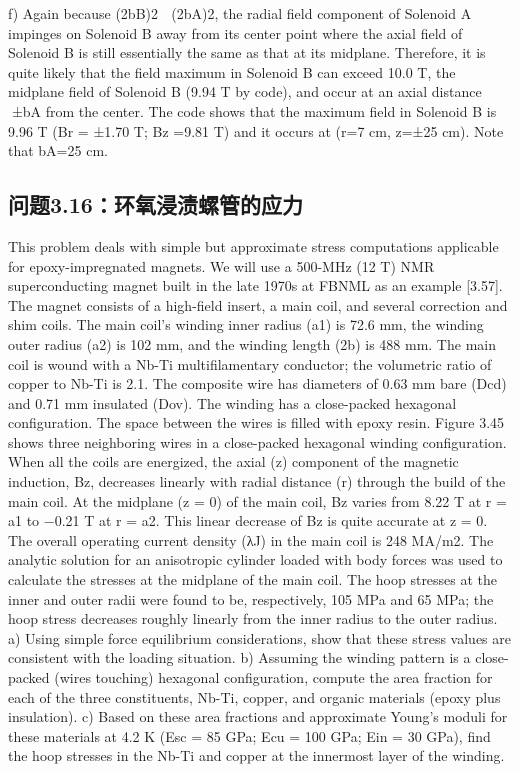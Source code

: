 f) Again because (2bB)2  (2bA)2, the radial field component of Solenoid A impinges on Solenoid B away from its center point where the axial field of Solenoid
B is still essentially the same as that at its midplane. Therefore, it is quite likely
that the field maximum in Solenoid B can exceed 10.0 T, the midplane field of
Solenoid B (9.94 T by code), and occur at an axial distance ∼±bA from the center.
The code shows that the maximum field in Solenoid B is 9.96 T (Br = ±1.70 T;
Bz =9.81 T) and it occurs at (r=7 cm, z=±25 cm). Note that bA=25 cm.
\newpage
\subsection{问题3.16：环氧浸渍螺管的应力}
This problem deals with simple but approximate stress computations applicable for
epoxy-impregnated magnets. We will use a 500-MHz (12 T) NMR superconducting magnet built in the late 1970s at FBNML as an example [3.57]. The magnet
consists of a high-field insert, a main coil, and several correction and shim coils.
The main coil’s winding inner radius (a1) is 72.6 mm, the winding outer radius
(a2) is 102 mm, and the winding length (2b) is 488 mm. The main coil is wound
with a Nb-Ti multifilamentary conductor; the volumetric ratio of copper to Nb-Ti
is 2.1. The composite wire has diameters of 0.63 mm bare (Dcd) and 0.71 mm insulated (Dov). The winding has a close-packed hexagonal configuration. The space
between the wires is filled with epoxy resin. Figure 3.45 shows three neighboring
wires in a close-packed hexagonal winding configuration.
When all the coils are energized, the axial (z) component of the magnetic induction, Bz, decreases linearly with radial distance (r) through the build of the main
coil. At the midplane (z = 0) of the main coil, Bz varies from 8.22 T at r = a1
to −0.21 T at r = a2. This linear decrease of Bz is quite accurate at z = 0. The
overall operating current density (λJ) in the main coil is 248 MA/m2.
The analytic solution for an anisotropic cylinder loaded with body forces was used
to calculate the stresses at the midplane of the main coil. The hoop stresses at
the inner and outer radii were found to be, respectively, 105 MPa and 65 MPa; the
hoop stress decreases roughly linearly from the inner radius to the outer radius.
a) Using simple force equilibrium considerations, show that these stress values
are consistent with the loading situation.
b) Assuming the winding pattern is a close-packed (wires touching) hexagonal
configuration, compute the area fraction for each of the three constituents,
Nb-Ti, copper, and organic materials (epoxy plus insulation).
c) Based on these area fractions and approximate Young’s moduli for these
materials at 4.2 K (Esc = 85 GPa; Ecu = 100 GPa; Ein = 30 GPa), find the
hoop stresses in the Nb-Ti and copper at the innermost layer of the winding.

